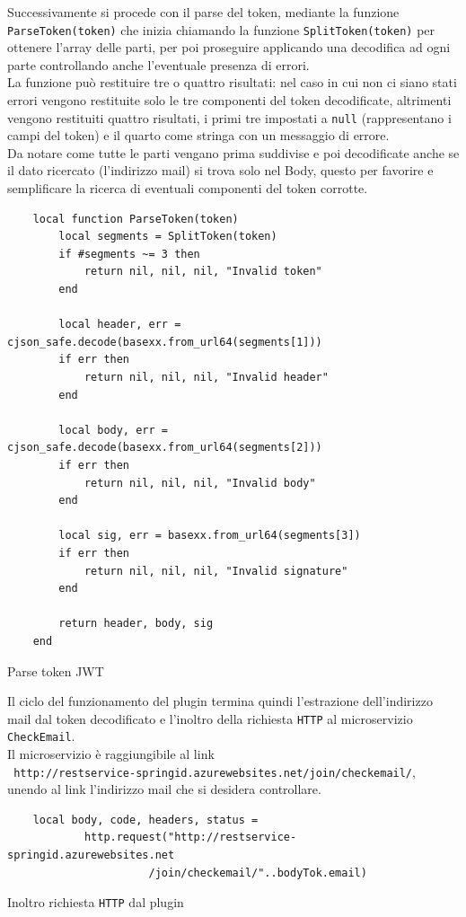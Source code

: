 Successivamente si procede con il parse del token, mediante la funzione \texttt{ParseToken(token)} che inizia chiamando la funzione \texttt{SplitToken(token)}
per ottenere l'array delle parti, per poi proseguire applicando una decodifica ad ogni parte controllando anche l'eventuale presenza di errori.\\
La funzione può restituire tre o quattro risultati: nel caso in cui non ci siano stati errori vengono restituite solo le tre componenti del token decodificate, altrimenti 
vengono restituiti quattro risultati, i primi tre impostati a \texttt{null} (rappresentano i campi del token) e il quarto come stringa con un messaggio di errore.\\
Da notare come tutte le parti vengano prima suddivise e poi decodificate anche se il dato ricercato (l'indirizzo mail) si trova solo nel Body, questo per favorire e semplificare 
la ricerca di eventuali componenti del token corrotte.

\begin{algorithm}
\centering
\begin{verbatim}
	local function ParseToken(token)
		local segments = SplitToken(token)
		if #segments ~= 3 then
			return nil, nil, nil, "Invalid token"
		end

		local header, err = cjson_safe.decode(basexx.from_url64(segments[1]))
		if err then
			return nil, nil, nil, "Invalid header"
		end

		local body, err = cjson_safe.decode(basexx.from_url64(segments[2]))
		if err then
			return nil, nil, nil, "Invalid body"
		end

		local sig, err = basexx.from_url64(segments[3])
		if err then
			return nil, nil, nil, "Invalid signature"
		end

		return header, body, sig
	end
\end{verbatim}
\caption{Parse token JWT}\label{alg:parsetoken}
\end{algorithm}
\newpage
Il ciclo del funzionamento del plugin termina quindi l'estrazione dell'indirizzo mail dal token decodificato e l'inoltro della richiesta \texttt{HTTP} al microservizio \texttt{CheckEmail}.\\
Il microservizio è raggiungibile al link\\ \texttt{ http://restservice-springid.azurewebsites.net/join/checkemail/}, \\unendo al link l'indirizzo mail che si desidera controllare.\\
\begin{algorithm}
\centering
\begin{verbatim}
    local body, code, headers, status = 
			http.request("http://restservice-springid.azurewebsites.net
				      /join/checkemail/"..bodyTok.email)
\end{verbatim}
\caption{Inoltro richiesta \texttt{HTTP} dal plugin}\label{alg:pluginhttprequest }
\end{algorithm}

